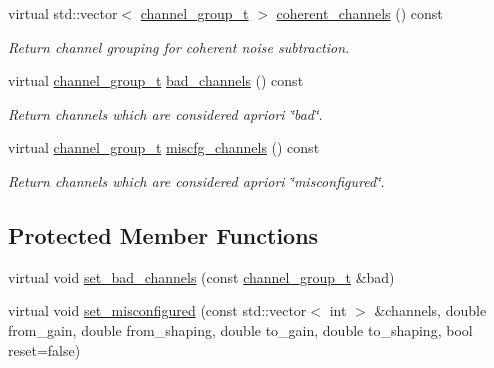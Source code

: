\begin{DoxyCompactItemize}
virtual std\+::vector$<$ \hyperlink{class_wire_cell_1_1_i_channel_noise_database_a7fedd6ab67ba4e7eeb8cf182cc9dc6b1}{channel\+\_\+group\+\_\+t} $>$ \hyperlink{class_wire_cell_1_1_sig_proc_1_1_omni_channel_noise_d_b_a8cdff2a7435fc85ff77b234a88aaaece}{coherent\+\_\+channels} () const
\begin{DoxyCompactList}\small\item\em Return channel grouping for coherent noise subtraction. \end{DoxyCompactList}\item 
virtual \hyperlink{class_wire_cell_1_1_i_channel_noise_database_a7fedd6ab67ba4e7eeb8cf182cc9dc6b1}{channel\+\_\+group\+\_\+t} \hyperlink{class_wire_cell_1_1_sig_proc_1_1_omni_channel_noise_d_b_a04ee13cfae6285a0c0ac160a259fb2b5}{bad\+\_\+channels} () const
\begin{DoxyCompactList}\small\item\em Return channels which are considered a\textquotesingle{}priori \char`\"{}bad\char`\"{}. \end{DoxyCompactList}\item 
virtual \hyperlink{class_wire_cell_1_1_i_channel_noise_database_a7fedd6ab67ba4e7eeb8cf182cc9dc6b1}{channel\+\_\+group\+\_\+t} \hyperlink{class_wire_cell_1_1_sig_proc_1_1_omni_channel_noise_d_b_a32b0db5811fe2d33ec566c31283800fa}{miscfg\+\_\+channels} () const
\begin{DoxyCompactList}\small\item\em Return channels which are considered a\textquotesingle{}priori \char`\"{}misconfigured\char`\"{}. \end{DoxyCompactList}\end{DoxyCompactItemize}
\subsection*{Protected Member Functions}
\begin{DoxyCompactItemize}
\item 
virtual void \hyperlink{class_wire_cell_1_1_sig_proc_1_1_omni_channel_noise_d_b_a42c1e7613ec776da66d7f30238128ce7}{set\+\_\+bad\+\_\+channels} (const \hyperlink{class_wire_cell_1_1_i_channel_noise_database_a7fedd6ab67ba4e7eeb8cf182cc9dc6b1}{channel\+\_\+group\+\_\+t} \&bad)
\item 
virtual void \hyperlink{class_wire_cell_1_1_sig_proc_1_1_omni_channel_noise_d_b_a7a1a60aef8d2935c36e27a735117a1cb}{set\+\_\+misconfigured} (const std\+::vector$<$ int $>$ \&channels, double from\+\_\+gain, double from\+\_\+shaping, double to\+\_\+gain, double to\+\_\+shaping, bool reset=false)
\end{DoxyCompactItemize}
